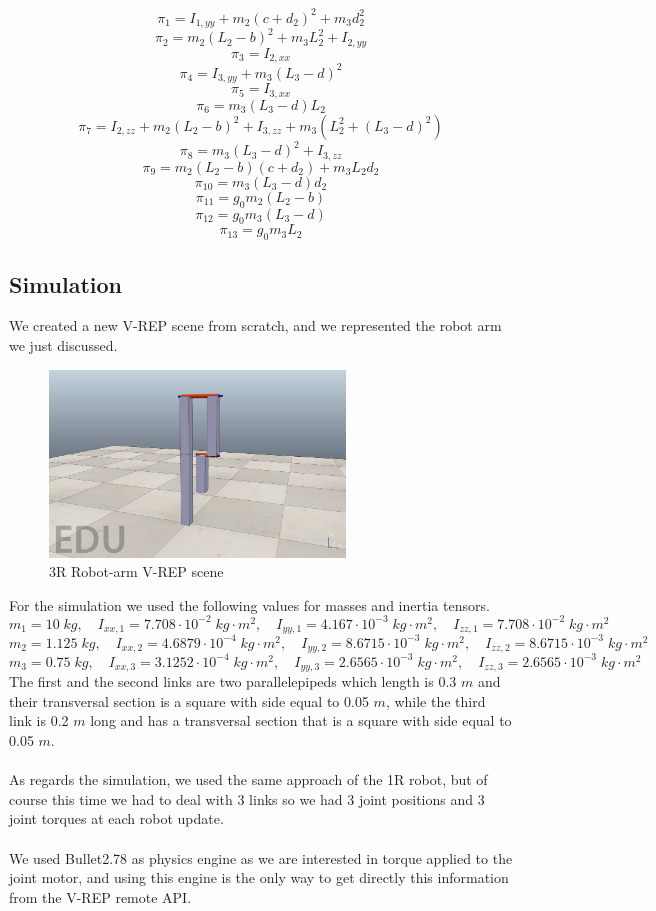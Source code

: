 \documentclass{article}
\begin{document}
\[\pi_1= I_{1,yy} + m_2 (c+ d_2)^2 + m_3 d_2^2\]
\[\pi_2 = m_2(L_2 -b)^2 + m_3 L_2^2 + I_{2,yy}\]
\[\pi_3 = I_{2,xx}\]
\[\pi_4 = I_{3,yy} + m_3(L_3 - d)^2\]
\[\pi_5 = I_{3,xx}\]
\[\pi_6 = m_3(L_3 -d)L_2\]
\[\pi_7 = I_{2,zz} + m_2(L_2 - b)^2 + I_{3,zz} + m_3(L_2^2 + (L_3 - d)^2 )\]
\[\pi_8 = m_3(L_3 -d)^2 + I_{3,zz}\]
\[\pi_9 = m_2(L_2 - b)(c+ d_2) + m_3 L_2 d_2\]
\[\pi_{10} = m_3(L_3 - d)d_2\]
\[\pi_{11} = g_0 m_2 (L_2 - b)\]
\[\pi_{12} = g_0 m_3 (L_3 - d)\]
\[\pi_{13} = g_0 m_3 L_2\]
\subsection{Simulation}
We created a new V-REP scene from scratch, and we represented the robot arm we just discussed.
\FloatBarrier
\begin{figure}[!htbp]
\centering
\includegraphics[width=0.7\textwidth]{images/3-dof/scene.png}
\caption{3R Robot-arm V-REP scene}
\end{figure}
\FloatBarrier
For the simulation we used the following values for masses and inertia tensors.
\[m_1 = 10 \;kg,\quad I_{xx,1} = 7.708\cdot 10^{-2}\;kg\cdot m^2,\quad I_{yy,1} = 4.167 \cdot 10^{-3}\;kg\cdot m^2,\quad I_{zz,1} = 7.708\cdot 10^{-2}\;kg\cdot m^2\]
\[ m_2 = 1.125\;kg,\quad I_{xx,2} = 4.6879\cdot10^{-4}\;kg\cdot m^2,\quad I_{yy,2} = 8.6715\cdot 10^{-3}\;kg\cdot m^2,\quad I_{zz,2} = 8.6715\cdot 10^{-3}\;kg\cdot m^2\]
\[m_3 = 0.75\;kg,\quad I_{xx,3} = 3.1252\cdot 10^{-4}\;kg\cdot m^2,\quad I_{yy,3} = 2.6565\cdot 10^{-3}\;kg\cdot m^2,\quad I_{zz,3} = 2.6565\cdot 10^{-3}\;kg\cdot m^2\]
The first and the second links are two parallelepipeds which length is 0.3 $m$ and their transversal section is a square with side equal to 0.05 $m$, while the third link is 0.2 $m$ long and has a transversal section that is a square with side equal to 0.05 $m$.\\\\
As regards the simulation, we used the same approach of the 1R robot, but of course this time we had to deal with 3 links so we had 3 joint positions and 3 joint torques at each robot update.\\\\
We used Bullet2.78 as physics engine as we are interested in torque applied to the joint motor, and using this engine is the only way to get directly this information from the V-REP remote API.
\end{document}
